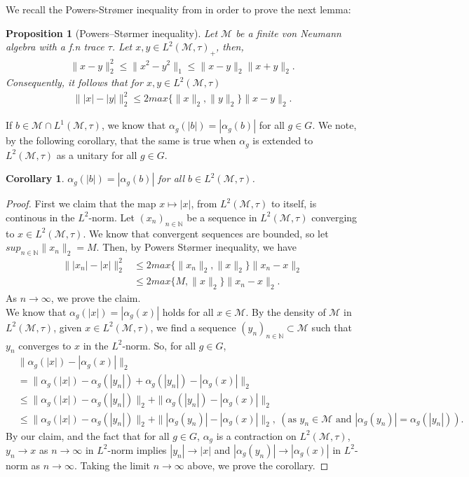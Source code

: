 \documentclass[11pt]{amsart}
\newtheorem{cor}[thm]{Corollary}
\newtheorem{prop}[thm]{Proposition}
\theoremstyle{definition}
\theoremstyle{myremark}
\numberwithin{equation}{section}
\newcommand{\CM}{\mathcal{M}}
\begin{document}
\noindent We recall the Powers-Str{\o}mer inequality from \cite{AnantharamanPopaII1} in order to prove the next lemma:
\begin{prop}[Powers--Størmer inequality]\label{PowerStormer} 
Let $\CM$ be a finite von Neumann algebra with a f.n trace $\tau$. 
Let $x, y \in L^{2}(\CM, \tau)_{+}$, then,
\begin{align*}
    \|x-y\|_2^{2} \leq \|x^{2}-y^{2}\|_1\leq\|x-y\|_2\|x+y\|_{2}.
\end{align*}
Consequently, it follows that for $x, y \in L^{2}(\CM,\tau)$
\begin{align*}
    \||x|-|y|\|_2^{2}\leq2max\{\|x\|_{2},\|y\|_{2}\}\|x-y\|_2.
\end{align*}
\end{prop}
If $b \in \CM\cap L^{1}(\CM,\tau)$, we know that $\alpha_{g}(|b|)=|\alpha_{g}(b)|$ for all $g \in G$. We note, by the following corollary, that the same is true when $\alpha_{g}$ is extended to $L^{2}(\CM,\tau)$ as a unitary for all $g \in G$. 
\begin{cor}\label{mod_preserving}
 $\alpha_{g}(|b|)=|\alpha_{g}(b)|$ for all $b \in L^{2}(\mathcal{M},\tau)$.
\end{cor}
\begin{proof}
First we claim  that the  map $x \mapsto |x|$, from $L^{2}(\mathcal{M},\tau)$ to itself, is continous in the $L^{2}$-norm.
Let $(x_n)_{n \in \mathbb{N}}$ be a sequence in $L^{2}(\CM,\tau)$ converging to $x \in L^{2}(\CM,\tau)$. We know that convergent sequences are bounded, so let $sup_{n\in \mathbb{N}}\|x_{n}\|_2=M$. Then, by Powers St{\o}rmer inequality, we have
\begin{align*}
    \||x_{n}|-|x|\|_2^{2}&\leq2max\{\|x_{n}\|_{2},\|x\|_{2}\}\|x_{n}-x\|_2\\
    &\leq2max\{M,\|x\|_{2}\}\|x_{n}-x\|_{2}.
\end{align*}
As $n \rightarrow\infty$, we prove the claim.\\
We know that $\alpha_{g}(|x|)=|\alpha_{g}(x)|$ holds for all $x \in \CM$. By the density of $\CM$ in $L^{2}(\mathcal{M},\tau)$, given $x \in L^{2}(\mathcal{M},\tau)$, we find a sequence $(y_{n})_{n \in \mathbb{N}} \subset \CM$ such that $y_{n}$ converges to $x$ in the $L^{2}$-norm. So, for all $g \in G$,
\begin{align*}
 &\|\alpha_g(|x|)-|\alpha_g(x)|\|_{2}\\&=\|\alpha_g(|x|)-\alpha_g(|y_{n}|)+\alpha_g(|y_n|)-|\alpha_g(x)|\|_2\\
&\leq \|\alpha_g(|x|)-\alpha_g(|y_{n}|)\|_2+\|\alpha_g(|y_n|)-|\alpha_g(x)|\|_2\\
&\leq \|\alpha_g(|x|)-\alpha_g(|y_{n}|)\|_2+\||\alpha_g(y_n)|-|\alpha_g(x)|\|_2, ~ (\text{as } y_n \in \CM \text{ and }   |\alpha_{g}(y_{n})|=\alpha_{g}(|y_{n}|)).
\end{align*}
By our claim, and the fact that for all $g \in G$, $\alpha_g$ is a contraction on $L^2(\mathcal{M},\tau)$, $y_{n} \rightarrow x$ as $n \rightarrow \infty$ in $L^{2}$-norm implies $|y_{n}| \rightarrow |x|$ and $|\alpha_g(y_{n})| \rightarrow |\alpha_g(x)|$ in $L^{2}$-norm as $n \rightarrow \infty$. Taking the limit $n \rightarrow \infty$ above, we prove the corollary.
\end{proof}
\end{document}
